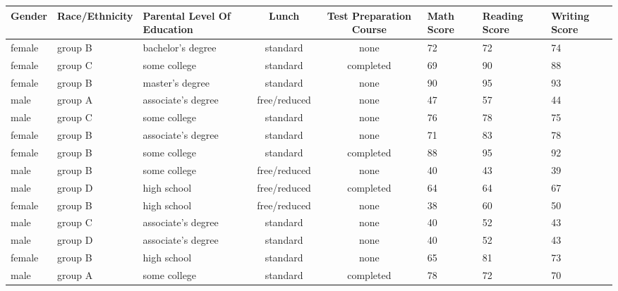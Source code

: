 \documentclass{article}
\begin{document}
	\begin{sidewaystable}[h!]
		\label{tab:table1}
		\begin{tabular}{|l|l|l|c|c|m{0.9cm}|m{1.28cm}|m{1.28cm}|}
			\hline
		\cellcolor{blue!25}	\textbf{Gender} & \cellcolor{blue!25} \textbf{Race/Ethnicity} & \cellcolor{blue!25} \textbf{Parental Level Of Education} & \cellcolor{blue!25} \textbf{Lunch} & \cellcolor{blue!25} \textbf{Test Preparation Course} & \cellcolor{blue!25} \textbf{Math Score} & \cellcolor{blue!25} \textbf{Reading Score} & \cellcolor{blue!25} \textbf{Writing Score} \\
			\hline
			female & group B & bachelor's degree & standard & none & 72 & 72 & 74 \\
			\hline
			female & group C & some college & standard & completed & 69 & 90 & 88 \\
			\hline
			female & group B & master's degree & standard & none & 90 & 95 & 93 \\
			\hline
			male & group A & associate's degree & free/reduced & none & 47 & 57 & 44 \\
			\hline
			male & group C & some college & standard & none & 76 & 78 & 75 \\
			\hline
			female & group B & associate's degree & standard & none & 71 & 83 & 78 \\
			\hline
			female & group B & some college & standard & completed & 88 & 95 & 92 \\
			\hline
			male & group B & some college & free/reduced & none & 40 & 43 & 39 \\
			\hline
			male & group D & high school & free/reduced & completed & 64 & 64 & 67 \\
			\hline
			female & group B & high school & free/reduced & none & 38 & 60 & 50 \\
			\hline
			male & group C & associate's degree & standard & none & 40 & 52 &43 \\
			\hline
			male & group D & associate's degree & standard & none &40 & 52 &43 \\
			\hline
			female & group B & high school & standard & none & 65 & 81 & 73 \\
			\hline
			male & group A & some college & standard & completed & 78 & 72 & 70 \\
			\hline
		\end{tabular}
	\end{sidewaystable}
\end{document}
